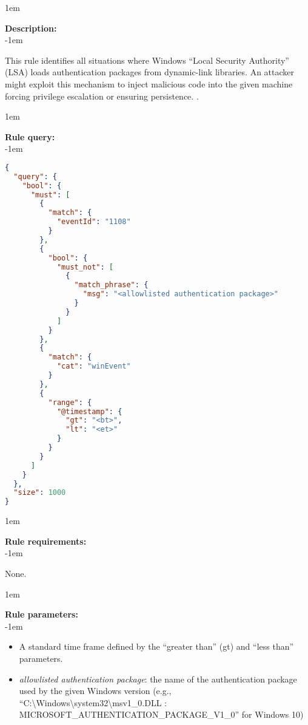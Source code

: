 \openup 1em

{\bf Description:} \\

\openup -1em
\vspace{-2em}


This rule identifies all situations where Windows ``Local Security Authority'' (LSA) loads authentication packages from dynamic-link libraries. An attacker might exploit this mechanism to inject malicious code into the given machine forcing privilege escalation or ensuring persistence. .

\openup 1em

{\bf Rule query:} \\

\openup -1em
\vspace{-2em}

\begin{lstlisting}[language=json,firstnumber=1]
{
  "query": {
    "bool": {
      "must": [
        {
          "match": {
            "eventId": "1108"
          }
        },
        {
          "bool": {
            "must_not": [
              {
                "match_phrase": {
                  "msg": "<allowlisted authentication package>"
                }
              }
            ]
          }
        },
        {
          "match": {
            "cat": "winEvent"
          }
        },
        {
          "range": {
            "@timestamp": {
              "gt": "<bt>",
              "lt": "<et>"
            }
          }
        }
      ]
    }
  },
  "size": 1000
}
\end{lstlisting}

\openup 1em

{\bf Rule requirements:} \\

\openup -1em
\vspace{-2em}

None.

\openup 1em

{\bf Rule parameters:} \\

\openup -1em
\vspace{-2em}

\begin{itemize}
	\item A standard time frame defined by the ``greater than'' (gt) and ``less than'' parameters.
	\item \emph{allowlisted authentication package}: the name of the authentication package used by the given Windows version (e.g., ``C:\textbackslash Windows\textbackslash system32\textbackslash msv1\_0.DLL : MICROSOFT\_AUTHENTICATION\_PACKAGE\_V1\_0'' for Windows 10)
\end{itemize}

